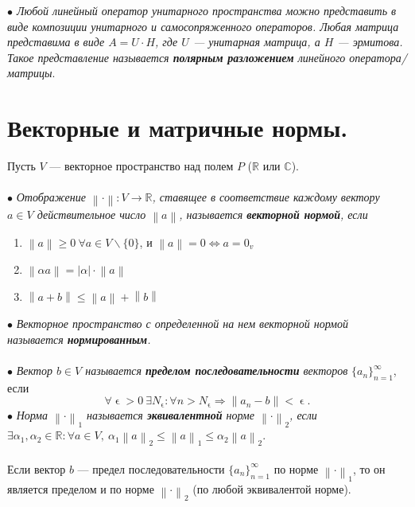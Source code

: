 \textit{$\bullet$ Любой линейный оператор унитарного пространства можно представить в виде композиции унитарного и самосопряженного операторов. Любая матрица представима в виде $A = U\cdot H$, где $U$ --- унитарная матрица, а $H$ --- эрмитова. Такое представление называется \textbf{полярным разложением} линейного оператора/матрицы}.






\section{Векторные и матричные нормы.}
Пусть $V$ --- векторное пространство над полем $P$ ($\mathbb{R}$ или $\mathbb{C}$).\\\\
$\bullet$ \textit{Отображение $\left \| \cdot  \right \|:V\rightarrow \mathbb{R}$, ставящее в соответствие каждому вектору $a\in V$ действительное число $\left \|a\right \|$, называется \textbf{векторной нормой}, если}
\begin{enumerate}
	\item $\left \|a\right \| \geqslant 0\ \forall a \in V\backslash\{0\}$, и $\left \|a\right \| = 0 \Leftrightarrow a = 0_v$
	\item $\left \|\alpha a\right \|=|\alpha|\cdot\left \|a\right \|$
	\item  $\left \|a+b\right \| \leqslant \left \|a\right \| + \left \|b\right \|$
\end{enumerate}
$\bullet$ \textit{Векторное пространство с определенной на нем векторной нормой называется \textbf{нормированным}.}\\\\
$\bullet$ \textit{Вектор $b\in V$ называется \textbf{пределом последовательности} векторов} $\{a_n\}^\infty_{n=1}$, если $$\forall\upvarepsilon >0\ \exists N_\upvarepsilon : \forall n > N_\upvarepsilon \Rightarrow \left \| a_n - b \right \| < \upvarepsilon. $$
$\bullet$ \textit{Норма $\left \| \cdot  \right \|_1$ называется \textbf{эквивалентной} норме $\left \| \cdot  \right \|_2$, если $\exists \alpha_1, \alpha_2\in \mathbb{R} : \forall a\in V,\ \alpha_1 \left \| a \right\|_2 \leqslant \left \| a \right\|_1\leqslant \alpha_2 \left \| a \right\|_2$}.\\\\
Если вектор $b$ --- предел последовательности $\{a_n\}^\infty_{n=1}$ по норме $\left \| \cdot \right \|_1$, то он является пределом и по норме $\left \| \cdot \right \|_2$ (по любой эквивалентой норме).\\ 

